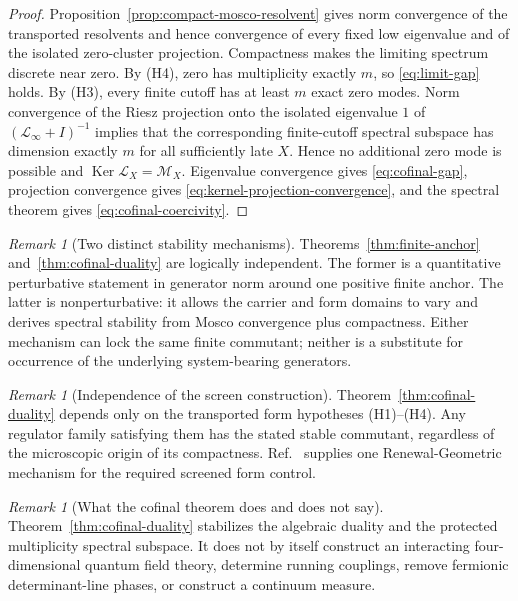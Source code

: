 \documentclass[11pt]{article}
\theoremstyle{definition}
\theoremstyle{remark}
\newtheorem{remark}[theorem]{Remark}
\newcommand{\Ker}{\operatorname{Ker}}
\newcommand{\M}{\mathcal M}
\begin{document}
\begin{proof}
Proposition~\ref{prop:compact-mosco-resolvent} gives norm convergence of the
transported resolvents and hence convergence of every fixed low eigenvalue and
of the isolated zero-cluster projection.  Compactness makes the limiting
spectrum discrete near zero.  By \textup{(H4)}, zero has multiplicity exactly
$m$, so \eqref{eq:limit-gap} holds.  By \textup{(H3)}, every finite cutoff has
at least $m$ exact zero modes.  Norm convergence of the Riesz projection onto
the isolated eigenvalue $1$ of $(\mathscr L_\infty+I)^{-1}$ implies that the
corresponding finite-cutoff spectral subspace has dimension exactly $m$ for
all sufficiently late $X$.  Hence no additional zero mode is possible and
$\Ker\mathscr L_X=\M_X$.  Eigenvalue convergence gives
\eqref{eq:cofinal-gap}, projection convergence gives
\eqref{eq:kernel-projection-convergence}, and the spectral theorem gives
\eqref{eq:cofinal-coercivity}.
\end{proof}

\begin{remark}[Two distinct stability mechanisms]
Theorems~\ref{thm:finite-anchor} and~\ref{thm:cofinal-duality} are logically
independent.  The former is a quantitative perturbative statement in generator
norm around one positive finite anchor.  The latter is nonperturbative: it
allows the carrier and form domains to vary and derives spectral stability from
Mosco convergence plus compactness.  Either mechanism can lock the same finite
commutant; neither is a substitute for occurrence of the underlying
system-bearing generators.
\end{remark}

\begin{remark}[Independence of the screen construction]
Theorem~\ref{thm:cofinal-duality} depends only on the transported form
hypotheses \textup{(H1)}--\textup{(H4)}.  Any regulator family satisfying them
has the stated stable commutant, regardless of the microscopic origin of its
compactness.  Ref.~\cite{PelissierSpectral2026} supplies one Renewal-Geometric
mechanism for the required screened form control.
\end{remark}

\begin{remark}[What the cofinal theorem does and does not say]
Theorem~\ref{thm:cofinal-duality} stabilizes the algebraic duality and the
protected multiplicity spectral subspace.  It does not by itself construct an
interacting four-dimensional quantum field theory, determine running
couplings, remove fermionic determinant-line phases, or construct a continuum
measure.
\end{remark}
\end{document}
